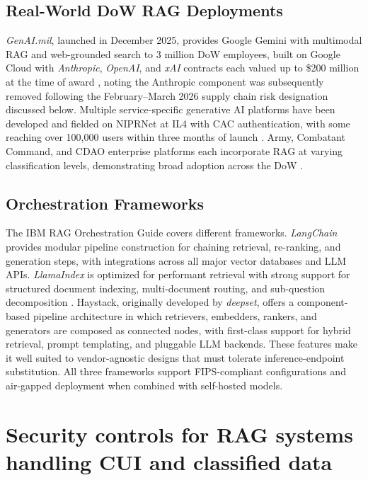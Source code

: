 \documentclass[12pt,letterpaper]{article}
\let\cite\parencite
\begin{document}
\subsection{Real-World DoW RAG Deployments}

\textit{GenAI.mil}, launched in December 2025, provides Google Gemini with multimodal RAG and web-grounded search to 3 million DoW employees, built on Google Cloud with \textit{Anthropic}, \textit{OpenAI}, and \textit{xAI} contracts each valued up to \$200 million at the time of award \cite{defensescoop_dec2025}, noting the Anthropic component was subsequently removed following the February--March 2026 supply chain risk designation discussed below. Multiple service-specific generative AI platforms have been developed and fielded on NIPRNet at IL4 with CAC authentication, with some reaching over 100,000 users within three months of launch \cite{vanroo2025}. Army, Combatant Command, and CDAO enterprise platforms each incorporate RAG at varying classification levels, demonstrating broad adoption across the DoW \cite{vanroo2025,asksage2025}.

\subsection{Orchestration Frameworks}

The IBM RAG Orchestration Guide \cite{ibm2024} covers different frameworks. \textit{LangChain} provides modular pipeline construction for chaining retrieval, re-ranking, and generation steps, with integrations across all major vector databases and LLM APIs. \textit{LlamaIndex} is optimized for performant retrieval with strong support for structured document indexing, multi-document routing, and sub-question decomposition \cite{paragon2024}. Haystack, originally developed by \textit{deepset}, offers a component-based pipeline architecture in which retrievers, embedders, rankers, and generators are composed as connected nodes, with first-class support for hybrid retrieval, prompt templating, and pluggable LLM backends. These features make it well suited to vendor-agnostic designs that must tolerate inference-endpoint substitution. All three frameworks support FIPS-compliant configurations and air-gapped deployment when combined with self-hosted models.

\section{Security controls for RAG systems handling CUI and classified data}
\end{document}
